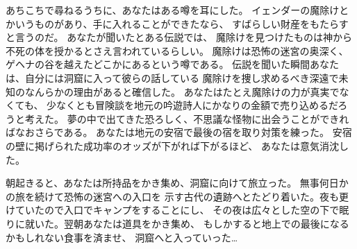 あちこちで尋ねるうちに、あなたはある噂を耳にした。
イェンダーの魔除けとかいうものがあり、手に入れることができたなら、
すばらしい財産をもたらすと言うのだ。
あなたが聞いたとある伝説では、
魔除けを見つけたものは神から不死の体を授かるとさえ言われているらしい。
魔除けは恐怖の迷宮の奥深く、ゲヘナの谷を越えたどこかにあるという噂である。
伝説を聞いた瞬間あなたは、自分には洞窟に入って彼らの話している
魔除けを捜し求めるべき深遠で未知のなんらかの理由があると確信した。
あなたはたとえ魔除けの力が真実でなくても、
少なくとも冒険談を地元の吟遊詩人にかなりの金額で売り込めるだろうと考えた。
夢の中で出てきた恐ろしく、不思議な怪物に出会うことができればなおさらである。
あなたは地元の安宿で最後の宿を取り対策を練った。
安宿の壁に掲げられた成功率のオッズが下がれば下がるほど、
あなたは意気消沈した。

\nd 朝起きると、あなたは所持品をかき集め、洞窟に向けて旅立った。
無事何日かの旅を続けて恐怖の迷宮への入口を
示す古代の遺跡へとたどり着いた。夜も更けていたので入口でキャンプをすることにし、
その夜は広々とした空の下で眠りに就いた。翌朝あなたは道具をかき集め、
もしかすると地上での最後になるかもしれない食事を済ませ、
洞窟へと入っていった…

